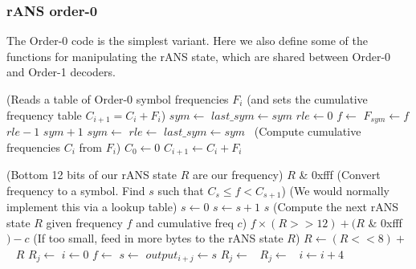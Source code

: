 \documentclass[a4paper]{article}
\begin{document}
\subsubsection*{rANS order-0}

The Order-0 code is the simplest variant.
Here we also define some of the functions for manipulating the rANS state, which are shared between Order-0 and Order-1 decoders.

\vskip 0.5cm

\begin{algorithmic}[1]
\Statex (Reads a table of Order-0 symbol frequencies $F_i$
\Statex (and sets the cumulative frequency table $C_{i+1} = C_i+F_i$)
\State $sym \gets$ 
\State $last\_sym \gets sym$
\State $rle \gets 0$
\Repeat
  \State $f \gets$ 
  \State $F_{sym} \gets f$
    \settowidth{\maxwidth}{sym\ }
    \State {} $rle-1$
    \State {} $sym+1$
  \Else
    \State $sym \gets$ 
      \State $rle \gets$ 
    \EndIf
  \EndIf
  \State $last\_sym \gets sym$
\Statex \quad\ (Compute cumulative frequencies $C_i$ from $F_i$)
\State $C_0 \gets 0$
  \State $C_{i+1} \gets C_i + F_i$
\EndFor
\EndProcedure

\Statex
\Statex (Bottom 12 bits of our rANS state $R$ are our frequency)
  \State \Return $R$ \& 0xfff
\EndFunction
\Statex
\Statex (Convert frequency to a symbol. Find $s$ such that $C_s \le f < C_{s+1}$)
\Statex (We would normally implement this via a lookup table)
  \State $s \gets 0$
    \State $s \gets s+1$
  \EndWhile
  \State \Return $s$
\EndFunction
\Statex
\Statex (Compute the next rANS state $R$ given frequency $f$ and cumulative freq $c$)
  \State \Return $f \times (R >> 12) + (R$ \& 0xfff$) - c$
\EndFunction
\Statex
\Statex (If too small, feed in more bytes to the rANS state $R$)
    \State $R \gets (R << 8) +$\ 
  \EndWhile
  \State \Return $R$
\EndFunction
\Statex
{}
  \State {} 
    \State $R_j \gets$ 
  \EndFor
  \State $i \gets 0$
       \Return
      \EndIf
      \State $f \gets$ 
      \State $s \gets$ 
      \State $output_{i+j} \gets s$
      \State $R_j \gets$\ 
      \State $R_j \gets$\ 
    \EndFor
    \State $i \gets i+4$
  \EndWhile
\EndProcedure
\end{algorithmic}
\end{document}
